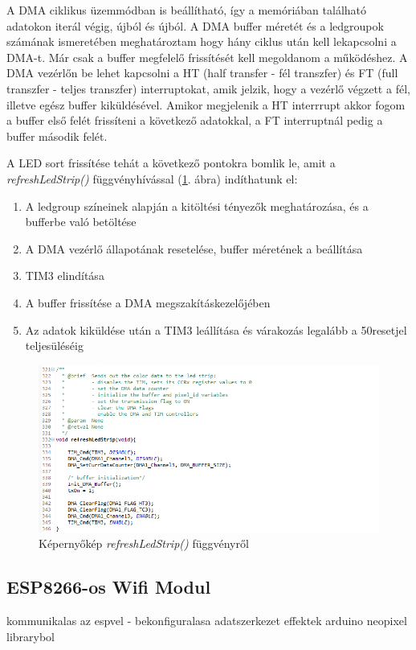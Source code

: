 \documentclass[../main.tex]{subfiles}
\begin{document}
             A DMA ciklikus üzemmódban is beállítható, így a memóriában található adatokon iterál végig, újból és újból. A DMA buffer méretét és a ledgroupok számának ismeretében meghatároztam hogy hány ciklus után kell lekapcsolni a DMA-t. Már csak a buffer megfelelő frissítését kell megoldanom a működéshez. A DMA vezérlőn be lehet kapcsolni a HT (half transfer - fél transzfer) és FT (full transzfer - teljes transzfer) interruptokat, amik jelzik, hogy a vezérlő végzett a fél, illetve egész buffer kiküldésével. Amikor megjelenik a HT interrrupt akkor fogom a buffer első felét frissíteni a következő adatokkal, a FT interruptnál pedig a buffer második felét. 
             
             A LED sort frissítése tehát a következő pontokra bomlik le, amit a \textit{refreshLedStrip()} függvényhívással (\ref{fig:ws2811_refreshledstrip}. ábra) indíthatunk el:
            \begin{enumerate}
                \item A ledgroup színeinek alapján a kitöltési tényezők meghatározása, és a bufferbe való betöltése
                \item A DMA vezérlő állapotának resetelése, buffer méretének a beállítása
                \item TIM3 elindítása
                \item A buffer frissítése a DMA megszakításkezelőjében
                \item Az adatok kiküldése után a TIM3 leállítása és várakozás legalább a 50\micros resetjel teljesüléséig
            \end{enumerate}
            
            \begin{figure}[h!]
                \centering
                    \includegraphics[width=12cm]{mbed_res/ws2811_refreshLedStrip}
                \caption{Képernyőkép \textit{refreshLedStrip()} függvényről}
                \label{fig:ws2811_refreshledstrip}
            \end{figure}
            
    \subsection{ESP8266-os Wifi Modul}
        
        
        
        
        
        
        kommunikalas az espvel - bekonfiguralasa
        adatszerkezet        
        effektek arduino neopixel librarybol
\end{document}
